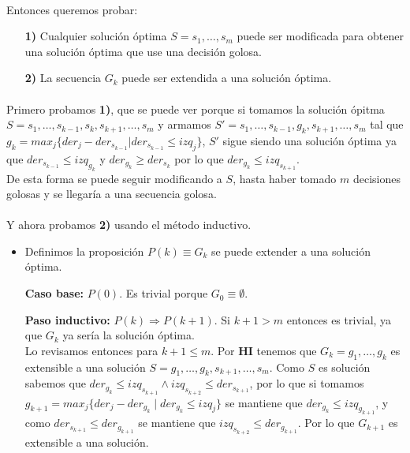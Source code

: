 \documentclass[./main.tex]{subfiles}
\begin{document}
\paragraph{} Entonces queremos probar: \begin{itemize}
  \item[\textbf{1)}] Cualquier solución óptima \(S = s_1, \ldots, s_m\) puede ser modificada para obtener una solución óptima que use una decisión golosa.
  \item[\textbf{2)}] La secuencia \(G_k\) puede ser extendida a una solución óptima.
\end{itemize}

\paragraph{} Primero probamos \textbf{1)}, que se puede ver porque si tomamos la solución ópitma \(S = s_1, \ldots, s_{k-1}, s_k, s_{k+1}, \ldots, s_m\) y armamos \(S' = s_1, \ldots, s_{k-1}, g_k, s_{k+1}, \ldots, s_m\) tal que \(g_k = max_j\{der_j - der_{s_{k-1}} | der_{s_{k-1}} \leq izq_j\}\), \(S'\) sigue siendo una solución óptima ya que \(der_{s_{k-1}} \leq izq_{g_k}\) y \(der_{g_k} \geq der_{s_k}\) por lo que \(der_{g_k} \leq izq_{s_{k+1}}\). \\
De esta forma se puede seguir modificando a \(S\), hasta haber tomado \(m\) decisiones golosas y se llegaría a una secuencia golosa.

\paragraph{} Y ahora probamos \textbf{2)} usando el método inductivo. \begin{itemize}
  \item Definimos la proposición \(P(k) \equiv G_k\) se puede extender a una solución óptima.
  \item[\textbf{Caso base:}] \(P(0)\). Es trivial porque \(G_0 \equiv \emptyset\).
  \item[\textbf{Paso inductivo:}] \(P(k) \Rightarrow P(k+1)\). Si \(k+1 > m\) entonces es trivial, ya que \(G_k\) ya sería la solución óptima. \\
    Lo revisamos entonces para \(k+1 \leq m\). Por \textbf{HI} tenemos que \(G_k = g_1, \ldots, g_k\) es extensible a una solución \(S = g_1, \ldots, g_k, s_{k+1}, \ldots, s_m\). Como \(S\) es solución sabemos que \(der_{g_k} \leq izq_{s_{k+1}} \land izq_{s_{k+2}} \leq der_{s_{k+1}}\), por lo que si tomamos \(g_{k+1} = max_j\{der_j - der_{g_k} \mid der_{g_k} \leq izq_j\}\) se mantiene que \(der_{g_k} \leq izq_{g_{k+1}}\), y como \(der_{s_{k+1}} \leq der_{g_{k+1}}\) se mantiene que \(izq_{s_{k+2}} \leq der_{g_{k+1}}\). Por lo que \(G_{k+1}\) es extensible a una solución. \done %
\end{itemize}
\end{document}
